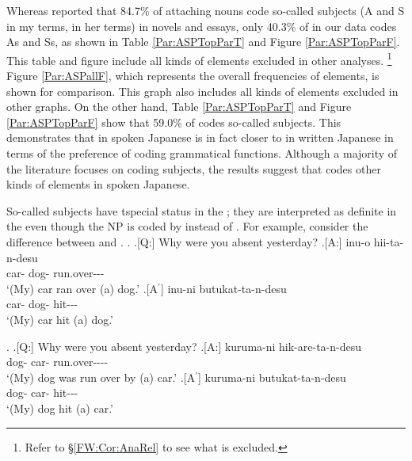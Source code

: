Whereas  reported that
84.7\% of  attaching nouns code so-called subjects (A and S in my terms,  in her terms) in novels and essays,
only 40.3\% of  in our data codes As and Ss,
as shown in Table \ref{Par:ASPTopParT} and Figure \ref{Par:ASPTopParF}.
This table and figure include all kinds of elements excluded in other analyses.%
 \footnote{
 Refer to \S \ref{FW:Cor:AnaRel} to see what is excluded.
 }
Figure \ref{Par:ASPallF},
which represents the overall frequencies of elements,
is shown for comparison.
This graph also includes all kinds of elements excluded in other graphs.
On the other hand, Table \ref{Par:ASPTopParT} and Figure \ref{Par:ASPTopParF} show that
59.0\% of  codes so-called subjects.
This demonstrates that
 in spoken Japanese is in fact closer to  in written Japanese
in terms of the preference of coding grammatical functions. %
Although a majority of the literature focuses on  coding subjects,
the results suggest that  codes other kinds of elements in spoken Japanese.

So-called subjects have tspecial status in the ;
they are interpreted as definite in the 
even though the NP is coded by  instead of .
For example,
consider the difference between \Next and \NNext.
%
\ex.
 \a.[Q:] Why were you absent yesterday?
 \bg.[A:]  inu-o hii-ta-n-desu \\
		car- dog- run.over--- \\
		`(My) car ran over (a) dog.'
 \bg.[A$^{\prime}$]  inu-ni butukat-ta-n-desu \\
   car- dog- hit--- \\
   `(My) car hit (a) dog.'
	
\ex. \a.[Q:] Why were you absent yesterday?
	\bg.[A:]  kuruma-ni hik-are-ta-n-desu \\
		dog- car- run.over---- \\
		`(My) dog was run over by (a) car.'
 \bg.[A$^{\prime}$]  kuruma-ni butukat-ta-n-desu \\
   dog- car- hit--- \\
   `(My) dog hit (a) car.'

